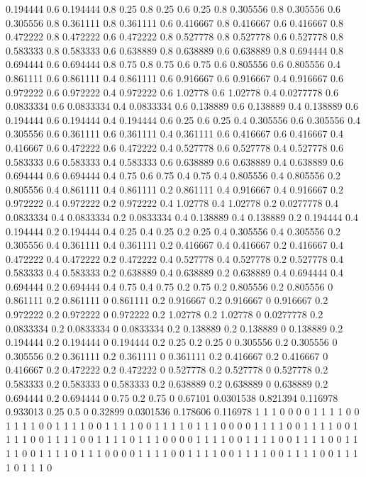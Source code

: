 0.194444 0.6
0.194444 0.8
0.25 0.8
0.25 0.6
0.25 0.8
0.305556 0.8
0.305556 0.6
0.305556 0.8
0.361111 0.8
0.361111 0.6
0.416667 0.8
0.416667 0.6
0.416667 0.8
0.472222 0.8
0.472222 0.6
0.472222 0.8
0.527778 0.8
0.527778 0.6
0.527778 0.8
0.583333 0.8
0.583333 0.6
0.638889 0.8
0.638889 0.6
0.638889 0.8
0.694444 0.8
0.694444 0.6
0.694444 0.8
0.75 0.8
0.75 0.6
0.75 0.6
0.805556 0.6
0.805556 0.4
0.861111 0.6
0.861111 0.4
0.861111 0.6
0.916667 0.6
0.916667 0.4
0.916667 0.6
0.972222 0.6
0.972222 0.4
0.972222 0.6
1.02778 0.6
1.02778 0.4
0.0277778 0.6
0.0833334 0.6
0.0833334 0.4
0.0833334 0.6
0.138889 0.6
0.138889 0.4
0.138889 0.6
0.194444 0.6
0.194444 0.4
0.194444 0.6
0.25 0.6
0.25 0.4
0.305556 0.6
0.305556 0.4
0.305556 0.6
0.361111 0.6
0.361111 0.4
0.361111 0.6
0.416667 0.6
0.416667 0.4
0.416667 0.6
0.472222 0.6
0.472222 0.4
0.527778 0.6
0.527778 0.4
0.527778 0.6
0.583333 0.6
0.583333 0.4
0.583333 0.6
0.638889 0.6
0.638889 0.4
0.638889 0.6
0.694444 0.6
0.694444 0.4
0.75 0.6
0.75 0.4
0.75 0.4
0.805556 0.4
0.805556 0.2
0.805556 0.4
0.861111 0.4
0.861111 0.2
0.861111 0.4
0.916667 0.4
0.916667 0.2
0.972222 0.4
0.972222 0.2
0.972222 0.4
1.02778 0.4
1.02778 0.2
0.0277778 0.4
0.0833334 0.4
0.0833334 0.2
0.0833334 0.4
0.138889 0.4
0.138889 0.2
0.194444 0.4
0.194444 0.2
0.194444 0.4
0.25 0.4
0.25 0.2
0.25 0.4
0.305556 0.4
0.305556 0.2
0.305556 0.4
0.361111 0.4
0.361111 0.2
0.416667 0.4
0.416667 0.2
0.416667 0.4
0.472222 0.4
0.472222 0.2
0.472222 0.4
0.527778 0.4
0.527778 0.2
0.527778 0.4
0.583333 0.4
0.583333 0.2
0.638889 0.4
0.638889 0.2
0.638889 0.4
0.694444 0.4
0.694444 0.2
0.694444 0.4
0.75 0.4
0.75 0.2
0.75 0.2
0.805556 0.2
0.805556 0
0.861111 0.2
0.861111 0
0.861111 0.2
0.916667 0.2
0.916667 0
0.916667 0.2
0.972222 0.2
0.972222 0
0.972222 0.2
1.02778 0.2
1.02778 0
0.0277778 0.2
0.0833334 0.2
0.0833334 0
0.0833334 0.2
0.138889 0.2
0.138889 0
0.138889 0.2
0.194444 0.2
0.194444 0
0.194444 0.2
0.25 0.2
0.25 0
0.305556 0.2
0.305556 0
0.305556 0.2
0.361111 0.2
0.361111 0
0.361111 0.2
0.416667 0.2
0.416667 0
0.416667 0.2
0.472222 0.2
0.472222 0
0.527778 0.2
0.527778 0
0.527778 0.2
0.583333 0.2
0.583333 0
0.583333 0.2
0.638889 0.2
0.638889 0
0.638889 0.2
0.694444 0.2
0.694444 0
0.75 0.2
0.75 0
0.67101 0.0301538
0.821394 0.116978
0.933013 0.25
0.5 0
0.32899 0.0301536
0.178606 0.116978
1 1
1 0
0 0
0 1
1 1
1 0
0 1
1 1
1 0
0 1
1 1
1 0
0 1
1 1
1 0
0 1
1 1
1 0
1 1
1 0
0 0
0 1
1 1
1 0
0 1
1 1
1 0
0 1
1 1
1 0
0 1
1 1
1 0
0 1
1 1
1 0
1 1
1 0
0 0
0 1
1 1
1 0
0 1
1 1
1 0
0 1
1 1
1 0
0 1
1 1
1 0
0 1
1 1
1 0
1 1
1 0
0 0
0 1
1 1
1 0
0 1
1 1
1 0
0 1
1 1
1 0
0 1
1 1
1 0
0 1
1 1
1 0
1 1
1 0
